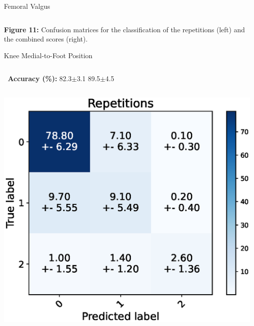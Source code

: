 \begin{frame}[fragile]{Femoral Valgus}
\begin{columns}
  \end{columns}
  {\scriptsize\newline\textbf{Figure 11:} Confusion matrices for the classification of the repetitions (left) and the combined scores (right).}
\end{frame}

\begin{frame}[fragile]{Knee Medial-to-Foot Position}
  \begin{columns}
    \textbf{\small~Accuracy (\%):} 82.3$\pm$3.1
    \vspace{0.3cm}
    \centering
    89.5$\pm$4.5
    \vspace{0.3cm}
  \end{columns}
  \begin{columns}
    \centering
    \includegraphics[width=\textwidth]{files/figs/res/kmfp/cnf-reps.eps}
    \centering

\end{columns}
\end{frame}
